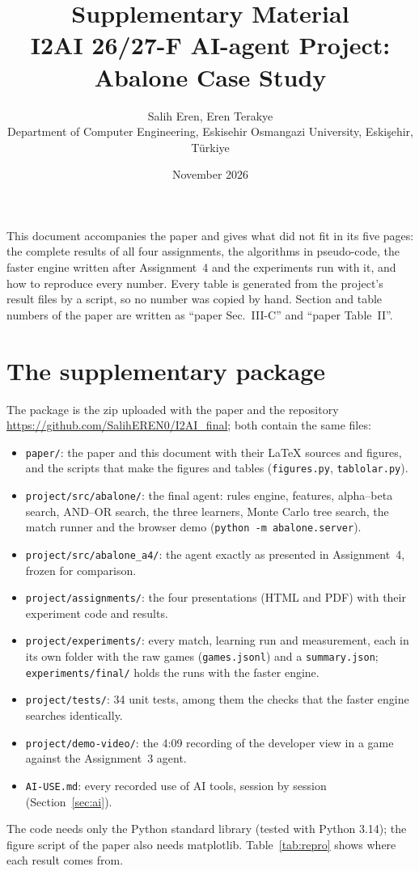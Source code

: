 \documentclass[a4paper,10pt]{article}
\title{\textbf{Supplementary Material}\\[2pt] \large I2AI 26/27-F AI-agent Project: Abalone Case Study}
\author{Salih Eren, Eren Terakye\\ \small Department of Computer Engineering, Eskisehir Osmangazi University, Eskişehir, Türkiye}
\date{November 2026}
\begin{document}
\maketitle
\thispagestyle{empty}

\noindent This document accompanies the paper and gives what did not fit in its five pages: the complete results
of all four assignments, the algorithms in pseudo-code, the faster engine written after Assignment~4 and the
experiments run with it, and how to reproduce every number. Every table is generated from the project's result
files by a script, so no number was copied by hand. Section and table numbers of the paper are written as
``paper Sec.~III-C'' and ``paper Table~II''.

\section{The supplementary package}
\label{sec:package}

The package is the zip uploaded with the paper and the repository
\url{https://github.com/SalihEREN0/I2AI_final}; both contain the same files:
\begin{itemize}
\item \texttt{paper/}: the paper and this document with their \LaTeX{} sources and figures, and the scripts that
  make the figures and tables (\texttt{figures.py}, \texttt{tablolar.py}).
\item \texttt{project/src/abalone/}: the final agent: rules engine, features, alpha--beta search, AND--OR search, the
  three learners, Monte Carlo tree search, the match runner and the browser demo (\texttt{python -m abalone.server}).
\item \texttt{project/src/abalone\_a4/}: the agent exactly as presented in Assignment~4, frozen for comparison.
\item \texttt{project/assignments/}: the four presentations (HTML and PDF) with their experiment code and results.
\item \texttt{project/experiments/}: every match, learning run and measurement, each in its own folder with the raw
  games (\texttt{games.jsonl}) and a \texttt{summary.json}; \texttt{experiments/final/} holds the runs with the faster
  engine.
\item \texttt{project/tests/}: 34 unit tests, among them the checks that the faster engine searches identically.
\item \texttt{project/demo-video/}: the 4:09 recording of the developer view in a game against the Assignment~3 agent.
\item \texttt{AI-USE.md}: every recorded use of AI tools, session by session (Section~\ref{sec:ai}).
\end{itemize}
The code needs only the Python standard library (tested with Python 3.14); the figure script of the paper also needs matplotlib. Table~\ref{tab:repro} shows where each
result comes from.
\end{document}
